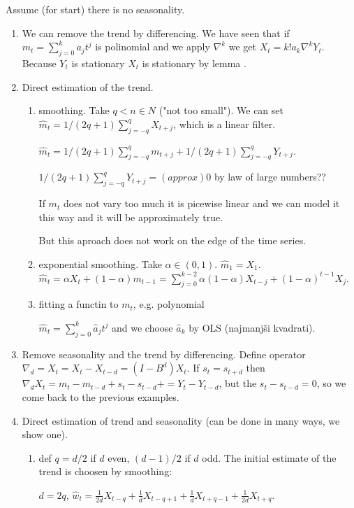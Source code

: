 \documentclass[12pt,a4paper]{amsart}
\theoremstyle{definition} %
\theoremstyle{plain} %
\begin{document}
Assume (for start) there is no seasonality. 
\begin{enumerate}
\item We can remove the trend by differencing. We have seen that if $m_t = \sum_{j=0}^ka_j t^j$ is polinomial and we apply $\nabla^k$ we get
$X_t = k! a_k \nabla^k Y_t$. Because $Y_t$ is stationary $X_t$ is stationary by lemma
.
\item Direct estimation of the trend. 
\begin{enumerate}
\item smoothing. Take $q < n \in N$ ("not too small"). We can set $\hat{m}_t = 1 / (2q + 1)\sum_{j = -q}^q X_{t+j}$, which is a linear filter. 

$\hat{m}_t = 1 / (2q + 1)\sum_{j = -q}^q m_{t+j}+ 1 / (2q + 1)\sum_{j = -q}^q Y_{t+j}$.

$1 / (2q + 1)\sum_{j = -q}^q Y_{t+j} = (approx) 0$ by law of large numbers??

If $m_t$ does not vary too much it is picewise linear and we can model it this way and it will be approximately true.

But this aproach does not work on the edge of the time series. 

\item exponential smoothing. Take $\alpha \in (0,1)$. $\hat{m}_1 = X_1$. $\hat{m}_t = \alpha X_t + (1 - \alpha) m_{t-1} =
\sum_{j = 0}^{k-2} \alpha(1-\alpha) X_{t-j} + (1-\alpha)^{t-1} X_j$.

\item fitting a functin to $m_t$, e.g. polynomial

$\hat{m}_t  =\sum_{j = 0}^k \hat{a}_jt^j$ and we choose $\hat{a}_k$ by OLS (najmanjši kvadrati).
\end{enumerate}
 \item Remove seasonality and the trend by differencing. Define operator $\nabla_d = X_t = X_t - X_{t -d} = (I - B^d)X_t$.
If $s_t = s_{t+d}$ then $\nabla_d X_t = m_t - m_{t-d} + s_t - s_{t-d}+=  Y_t - Y_{t-d}$, but the $ s_t - s_{t-d} = 0$, so we come back to the previous examples.

\item Direct estimation of trend and seasonality (can be done in many ways, we show one).
\begin{enumerate}
\item def $q = d/2$ if $d$ even, $(d-1) / 2$ if $d$ odd. The initial estimate of the trend is choosen by smoothing:

$d = 2q$, $\hat{w}_t = \frac{1}{2d}X_{t-q} + \frac{1}{d} X_{t-q+1} + \frac{1}{d}X_{t+q-1} + \frac{1}{2d}X_{t+q}$.


\end{enumerate}
\end{enumerate}
\end{document}
